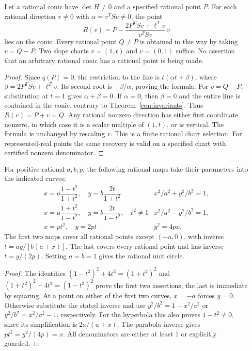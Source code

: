 \begin{theorem}\label{con:rational-point}
Let a rational conic have $\det H\ne0$ and a specified rational point $P$.
For each rational direction $v\ne0$ with $\alpha=v^TSv\ne0$, the point
\[
 R(v)=P-\frac{2P^TSv+\ell^Tv}{v^TSv}\,v
\]
lies on the conic. Every rational point $Q\ne P$ is obtained in this way
by taking $v=Q-P$. Two slope charts $v=(1,t)$ and $v=(0,1)$ suffice.
No assertion that an arbitrary rational conic has a rational point is
being made.
\end{theorem}
\begin{proof}
Since $q(P)=0$, the restriction to the line is
$t(\alpha t+\beta)$, where $\beta=2P^TSv+\ell^Tv$.
Its second root is $-\beta/\alpha$, proving the formula.
For $v=Q-P$, substitution at $t=1$ gives $\alpha+\beta=0$.
If $\alpha=0$, then $\beta=0$ and the entire line is contained in the
conic, contrary to Theorem~\ref{con:invariants}. Thus $R(v)=P+v=Q$.
Any rational nonzero direction has either first coordinate nonzero,
in which case it is a scalar multiple of $(1,t)$, or is vertical.
The formula is unchanged by rescaling $v$. This is a finite rational
chart selection. For represented-real points the same recovery is
valid on a specified chart with certified nonzero denominator.
\end{proof}

\begin{proposition}\label{con:standard-param}
For positive rational $a,b,p$, the following rational maps take their
parameters into the indicated curves:
\[
 \begin{array}{ll}
 x=a\dfrac{1-t^2}{1+t^2},\quad y=b\dfrac{2t}{1+t^2}
   & x^2/a^2+y^2/b^2=1,\\[6pt]
 x=a\dfrac{1+t^2}{1-t^2},\quad y=b\dfrac{2t}{1-t^2},\quad t^2\ne1
   & x^2/a^2-y^2/b^2=1,\\[6pt]
 x=pt^2,\quad y=2pt & y^2=4px.
 \end{array}
\]
The first two maps cover all rational points except $(-a,0)$, with
inverse $t=ay/[b(a+x)]$. The last covers every rational point and has
inverse $t=y/(2p)$. Setting $a=b=1$ gives the rational unit circle.
\end{proposition}
\begin{proof}
The identities $(1-t^2)^2+4t^2=(1+t^2)^2$ and
$(1+t^2)^2-4t^2=(1-t^2)^2$ prove the first two assertions; the last
is immediate by squaring. At a point on either of the first two curves,
$x=-a$ forces $y=0$. Otherwise substitute the stated inverse and use
$y^2/b^2=1-x^2/a^2$ or $y^2/b^2=x^2/a^2-1$, respectively.
For the hyperbola this also proves $1-t^2\ne0$, since its simplification
is $2a/(a+x)$. The parabola inverse gives $pt^2=y^2/(4p)=x$.
All denominators are either at least $1$ or explicitly guarded.
\end{proof}

